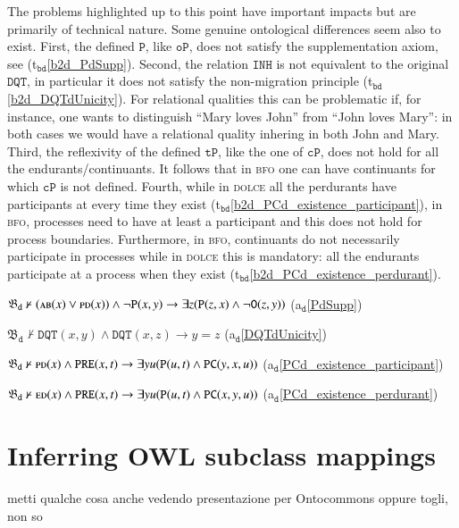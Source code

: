 \documentclass[ao]{iosart2x}
\newcommand{\bflist}{\begin{list}{}{\setlength{\topsep}{2mm}\setlength{\parsep}{0mm}\setlength{\leftmargin}{9.2mm}\setlength{\labelwidth}{8mm}}}
\newcommand{\eflist}{\end{list}}
\newcommand{\dolceAxLabel}{\textrm{a$_\texttt{d}$}}
\newcommand{\bdThrLabel}{\textrm{t$_\texttt{bd}$}}
\newcounter{cntbdth}
\newcommand{\bdth}[1]{\refstepcounter{cntbdth}\begin{small}{\bf \bdThrLabel\thecntbdth\label{#1}}\end{small}}
\newcommand{\refdolceax}[1]{({\dolceAxLabel}\ref{#1})}
\newcommand{\refbdth}[1]{({\bdThrLabel}\ref{#1})}
\newcommand{\pr}[1]{\mathtt{#1}}
\newcommand{\dolce}{{\textsc{dolce}}}
\newcommand{\bfo}{{\textsc{bfo}}}
\newcommand {\thbfobdmap} {\ensuremath{\mathfrak{B}_\texttt{d}}}
\newcommand {\ABdcat} {\textsc{ab}}
\newcommand {\EDdcat} {\textsc{ed}}
\newcommand {\PDdcat} {\textsc{pd}}
\newcommand {\TPd} {\ensuremath{\pr{tP}}}
\newcommand {\Pd} {\ensuremath{\pr{P}}}
\newcommand {\Od} {\ensuremath{\pr{O}}}
\newcommand {\PREd} {\ensuremath{\pr{PRE}}}
\newcommand {\DQTd} {\ensuremath{\pr{DQT}}}
\newcommand {\PCd} {\ensuremath{\pr{PC}}}
\newcommand{\bfocpart}{\pr{cP}}
\newcommand{\bfoopart}{\pr{oP}}
\newcommand{\bfoinh}{\pr{INH}}
\begin{document}
The problems highlighted up to this point have important impacts but are primarily of technical nature. Some genuine ontological differences seem also to exist. First, the defined $\Pd$, like $\bfoopart$, does not satisfy the supplementation axiom, see \refbdth{b2d_PdSupp}. Second, the relation $\bfoinh$ is not equivalent to the original $\DQTd$, in particular it does not satisfy the non-migration principle \refbdth{b2d_DQTdUnicity}. For relational qualities this can be problematic if, for instance, one wants to distinguish ``Mary loves John'' from ``John loves Mary'': in both cases we would have a relational quality inhering in both John and Mary. Third, the reflexivity of the defined $\TPd$, like the one of $\bfocpart$, does not hold for all the endurants/continuants. It follows that in {\bfo} one can have continuants for which $\bfocpart$ is not defined.  Fourth, while in {\dolce} all the perdurants have participants at every time they exist \refbdth{b2d_PCd_existence_participant}, in {\bfo}, processes need to have at least a participant and this does not hold for process boundaries. Furthermore, in {\bfo}, continuants do not necessarily participate in processes while in {\dolce} this is mandatory: all the endurants participate at a process when they exist \refbdth{b2d_PCd_existence_perdurant}.
%
\bflist
\item[\bdth{b2d_PdSupp}] $\thbfobdmap \nvdash (\ABdcat(x) \lor \PDdcat(x)) \land \neg\Pd(x,y) \to \exists z (\Pd(z,x) \land \neg \Od(z,y))$ 
\hfill{\refdolceax{PdSupp}} 

\item[\bdth{b2d_DQTdUnicity}] $\thbfobdmap \nvdash \DQTd(x,y) \land \DQTd(x,z) \to y=z$ 
\hfill{\refdolceax{DQTdUnicity}} 

\item[\bdth{b2d_PCd_existence_participant}] $\thbfobdmap \nvdash \PDdcat(x) \land \PREd(x,t) \to \exists yu(\Pd(u,t) \land \PCd(y,x,u))$ 
\hfill{\refdolceax{PCd_existence_participant}} 

\item[\bdth{b2d_PCd_existence_perdurant}] $\thbfobdmap \nvdash \EDdcat(x) \land \PREd(x,t) \to \exists yu (\Pd(u,t) \land \PCd(x,y,u))$ 
\hfill{\refdolceax{PCd_existence_perdurant}} 
\eflist

\section{Inferring OWL subclass mappings}
{\color{red} metti qualche cosa anche vedendo presentazione per Ontocommons oppure togli, non so}
\end{document}
